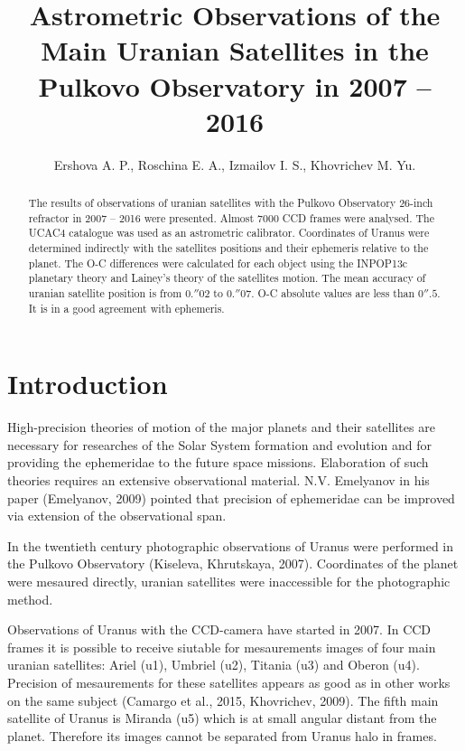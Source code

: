 \documentclass[]{article}
\title{Astrometric Observations of the Main Uranian Satellites in the Pulkovo Observatory in 2007 -- 2016}
\author{Ershova A. P., Roschina E. A., Izmailov I. S., Khovrichev M. Yu.}
\begin{document}
\maketitle

\begin{abstract}
The results of observations of uranian satellites with the Pulkovo Observatory 26-inch refractor in 2007 -- 2016 were presented. Almost 7000 CCD frames were analysed. The UCAC4 catalogue was used as an astrometric calibrator. Coordinates of Uranus were determined indirectly with the satellites positions and their ephemeris relative to the planet. The O-C differences were calculated for each object using the INPOP13c planetary theory and Lainey's theory of the satellites motion. The mean accuracy of uranian satellite position is from $0.''02$ to $0.''07$. O-C absolute values are less than $0''.5$. It is in a good agreement with ephemeris.
\end{abstract}

\section{Introduction}
High-precision theories of motion of the major planets and their satellites  are necessary for researches of the Solar System formation and evolution and for providing the ephemeridae to the future space missions. Elaboration of such theories requires an extensive observational material. N.V. Emelyanov in his paper (Emelyanov, 2009) pointed that precision of ephemeridae can be improved via extension of the observational span.\par

In the twentieth century photographic observations of Uranus were performed in the Pulkovo Observatory (Kiseleva, Khrutskaya, 2007). Coordinates of the planet were mesaured directly, uranian satellites were inaccessible for the photographic method.\par

Observations of Uranus with the CCD-camera have started in 2007. In CCD frames it is possible to receive siutable for mesaurements images of four main uranian satellites: Ariel (u1), Umbriel (u2), Titania (u3) and Oberon (u4). Precision of mesaurements for these satellites appears as good as in other works on the same subject (Camargo et al., 2015, Khovrichev, 2009). The fifth main satellite of Uranus is Miranda (u5) which is at small angular distant from the planet. Therefore its images cannot be separated from Uranus halo in frames.\par
\end{document}
